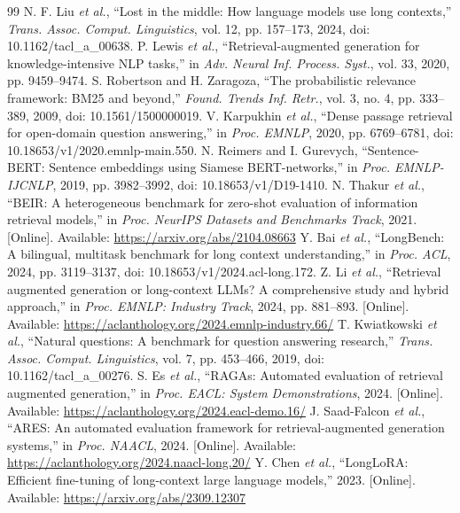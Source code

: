 \documentclass[conference]{IEEEtran}
\begin{document}
\begin{thebibliography}{99}
 N. F. Liu \emph{et al.}, ``Lost in the middle: How language models use long contexts,'' \emph{Trans. Assoc. Comput. Linguistics}, vol. 12, pp. 157--173, 2024, doi: 10.1162/tacl\_a\_00638.
 P. Lewis \emph{et al.}, ``Retrieval-augmented generation for knowledge-intensive NLP tasks,'' in \emph{Adv. Neural Inf. Process. Syst.}, vol. 33, 2020, pp. 9459--9474.
 S. Robertson and H. Zaragoza, ``The probabilistic relevance framework: BM25 and beyond,'' \emph{Found. Trends Inf. Retr.}, vol. 3, no. 4, pp. 333--389, 2009, doi: 10.1561/1500000019.
 V. Karpukhin \emph{et al.}, ``Dense passage retrieval for open-domain question answering,'' in \emph{Proc. EMNLP}, 2020, pp. 6769--6781, doi: 10.18653/v1/2020.emnlp-main.550.
 N. Reimers and I. Gurevych, ``Sentence-BERT: Sentence embeddings using Siamese BERT-networks,'' in \emph{Proc. EMNLP-IJCNLP}, 2019, pp. 3982--3992, doi: 10.18653/v1/D19-1410.
 N. Thakur \emph{et al.}, ``BEIR: A heterogeneous benchmark for zero-shot evaluation of information retrieval models,'' in \emph{Proc. NeurIPS Datasets and Benchmarks Track}, 2021. [Online]. Available: \url{https://arxiv.org/abs/2104.08663}
 Y. Bai \emph{et al.}, ``LongBench: A bilingual, multitask benchmark for long context understanding,'' in \emph{Proc. ACL}, 2024, pp. 3119--3137, doi: 10.18653/v1/2024.acl-long.172.
 Z. Li \emph{et al.}, ``Retrieval augmented generation or long-context LLMs? A comprehensive study and hybrid approach,'' in \emph{Proc. EMNLP: Industry Track}, 2024, pp. 881--893. [Online]. Available: \url{https://aclanthology.org/2024.emnlp-industry.66/}
 T. Kwiatkowski \emph{et al.}, ``Natural questions: A benchmark for question answering research,'' \emph{Trans. Assoc. Comput. Linguistics}, vol. 7, pp. 453--466, 2019, doi: 10.1162/tacl\_a\_00276.
 S. Es \emph{et al.}, ``RAGAs: Automated evaluation of retrieval augmented generation,'' in \emph{Proc. EACL: System Demonstrations}, 2024. [Online]. Available: \url{https://aclanthology.org/2024.eacl-demo.16/}
 J. Saad-Falcon \emph{et al.}, ``ARES: An automated evaluation framework for retrieval-augmented generation systems,'' in \emph{Proc. NAACL}, 2024. [Online]. Available: \url{https://aclanthology.org/2024.naacl-long.20/}
 Y. Chen \emph{et al.}, ``LongLoRA: Efficient fine-tuning of long-context large language models,'' 2023. [Online]. Available: \url{https://arxiv.org/abs/2309.12307}
\end{thebibliography}
\end{document}
